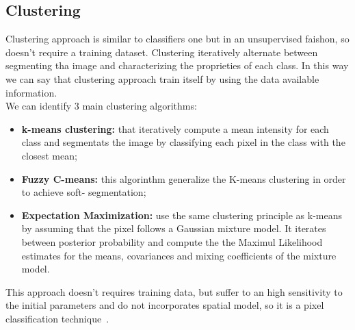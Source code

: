 \documentclass{standalone}
\begin{document}
	\subsection{Clustering}

		Clustering approach is similar to classifiers one but in an unsupervised faishon, so doesn't require a training dataset.
		Clustering iteratively alternate between segmenting tha image and characterizing the  proprieties of each class. In this way we can say that clustering approach train itself by using the data available information.\\
		We can identify 3 main clustering algorithms: 
		\begin{itemize}
	
			\item \textbf{k-means clustering: } that iteratively compute a mean intensity for each class and segmentats the image by classifying each pixel in the class with the closest mean;
	
			\item \textbf{Fuzzy C-means: } this algorinthm generalize the K-means clustering in order to achieve soft- segmentation;
		
			\item \textbf{Expectation Maximization:} use the same clustering principle as k-means by assuming that the pixel follows a Gaussian mixture model. It iterates between posterior probability and compute the the Maximul Likelihood estimates for the means, covariances and mixing coefficients of the mixture model. 
	
		\end{itemize}

		This approach doesn't requires training data, but suffer to an high sensitivity to the initial parameters and do not incorporates spatial model, so it is a pixel classification technique~\cite{ART:Pham}. 
\end{document}
